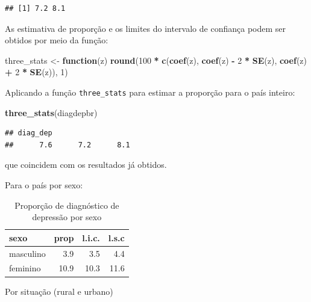 \documentclass[]{book}
\newenvironment{Shaded}{\begin{snugshade}}{\end{snugshade}}
\newcommand{\KeywordTok}[1]{\textcolor[rgb]{0.13,0.29,0.53}{\textbf{#1}}}
\newcommand{\DecValTok}[1]{\textcolor[rgb]{0.00,0.00,0.81}{#1}}
\newcommand{\StringTok}[1]{\textcolor[rgb]{0.31,0.60,0.02}{#1}}
\newcommand{\ControlFlowTok}[1]{\textcolor[rgb]{0.13,0.29,0.53}{\textbf{#1}}}
\newcommand{\OperatorTok}[1]{\textcolor[rgb]{0.81,0.36,0.00}{\textbf{#1}}}
\newcommand{\NormalTok}[1]{#1}
\theoremstyle{definition}
\theoremstyle{definition}
\theoremstyle{definition}
\theoremstyle{remark}
\begin{document}
\begin{verbatim}
## [1] 7.2 8.1
\end{verbatim}

As estimativa de proporção e os limites do intervalo de confiança podem
ser obtidos por meio da função:

\begin{Shaded}
\begin{Highlighting}[]
\NormalTok{three_stats <-}\StringTok{ }\ControlFlowTok{function}\NormalTok{(z) }\KeywordTok{round}\NormalTok{(}\DecValTok{100} \OperatorTok{*}\StringTok{ }\KeywordTok{c}\NormalTok{(}\KeywordTok{coef}\NormalTok{(z), }\KeywordTok{coef}\NormalTok{(z) }\OperatorTok{-}\StringTok{ }
\StringTok{  }\DecValTok{2} \OperatorTok{*}\StringTok{ }\KeywordTok{SE}\NormalTok{(z), }\KeywordTok{coef}\NormalTok{(z) }\OperatorTok{+}\StringTok{ }\DecValTok{2} \OperatorTok{*}\StringTok{ }\KeywordTok{SE}\NormalTok{(z)), }\DecValTok{1}\NormalTok{)}
\end{Highlighting}
\end{Shaded}

Aplicando a função \texttt{three\_stats} para estimar a proporção para o
país inteiro:

\begin{Shaded}
\begin{Highlighting}[]
\KeywordTok{three_stats}\NormalTok{(diagdepbr)}
\end{Highlighting}
\end{Shaded}

\begin{verbatim}
## diag_dep                   
##      7.6      7.2      8.1
\end{verbatim}

que coincidem com os resultados já obtidos.

Para o país por sexo:

\begin{table}

\caption{\label{tab:unnamed-chunk-46}Proporção de diagnóstico de depressão por sexo}
\centering
\begin{tabular}[t]{lrrr}
\toprule
sexo & prop & l.i.c. & l.s.c\\
\midrule
masculino & 3.9 & 3.5 & 4.4\\
feminino & 10.9 & 10.3 & 11.6\\
\bottomrule
\end{tabular}
\end{table}

Por situação (rural e urbano)
\end{document}
